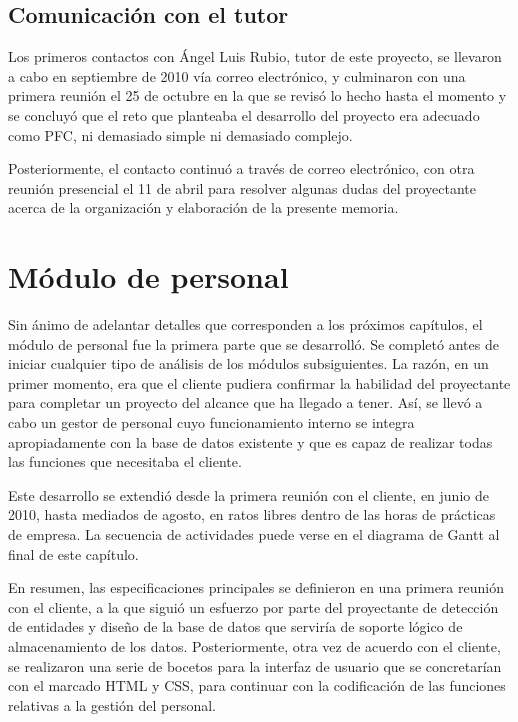 \subsection{Comunicación con el tutor}

Los primeros contactos con Ángel Luis Rubio, tutor de este proyecto, se
llevaron a cabo en septiembre de 2010 vía correo electrónico, y culminaron con
una primera reunión el 25 de octubre en la que se revisó lo hecho hasta el
momento y se concluyó que el reto que planteaba el desarrollo del proyecto
era adecuado como PFC, ni demasiado simple ni demasiado complejo.

Posteriormente, el contacto continuó a través de correo electrónico, con otra
reunión presencial el 11 de abril para resolver algunas dudas del proyectante
acerca de la organización y elaboración de la presente memoria.

\section{Módulo de personal}

Sin ánimo de adelantar detalles que corresponden a los próximos capítulos,
el módulo de personal fue la primera parte que se desarrolló. Se completó antes
de iniciar cualquier tipo de análisis de los módulos subsiguientes. La razón,
en un primer momento, era que el cliente pudiera confirmar la habilidad del
proyectante para completar un proyecto del alcance que ha llegado a tener. Así,
se llevó a cabo un gestor de personal cuyo funcionamiento interno se integra
apropiadamente con la base de datos existente y que es capaz de realizar todas
las funciones que necesitaba el cliente.

Este desarrollo se extendió desde la primera reunión con el cliente, en junio
de 2010, hasta mediados de agosto, en ratos libres dentro de las horas de
prácticas de empresa. La secuencia de actividades puede verse en el diagrama de
Gantt al final de este capítulo.

En resumen, las especificaciones principales
se definieron en una primera reunión con el cliente, a la que siguió un
esfuerzo por parte del proyectante de detección de entidades y diseño de la
base de datos que serviría de soporte lógico de almacenamiento de los datos.
Posteriormente, otra vez de acuerdo con el cliente, se realizaron una serie de
bocetos para la interfaz de usuario que se concretarían con el marcado HTML y
CSS, para continuar con la codificación de las funciones relativas a la gestión
del personal.


